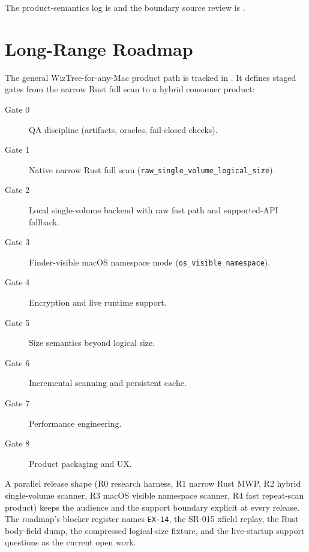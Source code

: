 The product-semantics log is
 and the
boundary source review is
.

\section{Long-Range Roadmap}

The general WizTree-for-any-Mac product path is tracked in
. It defines
staged gates from the narrow Rust full scan to a hybrid consumer product:

\begin{description}
  \item[Gate 0] QA discipline (artifacts, oracles, fail-closed checks).
  \item[Gate 1] Native narrow Rust full scan
  (\texttt{raw\_single\_volume\_logical\_size}).
  \item[Gate 2] Local single-volume backend with raw fast path and supported-API
  fallback.
  \item[Gate 3] Finder-visible macOS namespace mode
  (\texttt{os\_visible\_namespace}).
  \item[Gate 4] Encryption and live runtime support.
  \item[Gate 5] Size semantics beyond logical size.
  \item[Gate 6] Incremental scanning and persistent cache.
  \item[Gate 7] Performance engineering.
  \item[Gate 8] Product packaging and UX.
\end{description}

A parallel release shape (R0 research harness, R1 narrow Rust MWP, R2 hybrid
single-volume scanner, R3 macOS visible namespace scanner, R4 fast repeat-scan
product) keeps the audience and the support boundary explicit at every release.
The roadmap's blocker register names \texttt{EX-14}, the SR-015 xfield replay,
the Rust body-field dump, the compressed logical-size fixture, and the
live-startup support questions as the current open work.
